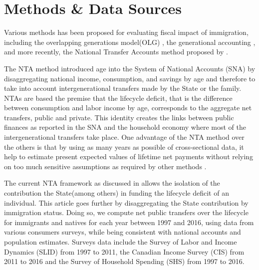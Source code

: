   \section*{Methods \& Data Sources}\label{sec:data}

  Various methods has been proposed for evaluating fiscal impact of immigration, including the overlapping generations model(OLG) \citep{Akin:2012gh,Ileri:2019hf,Storesletten:2000cn}, the generational accounting \citep{Auerbach:2000wg,Preston:2014uw,Sokhna:2018ww}, and more recently, the National Transfer Accounts  method proposed by \citet{Mason:2011wc}.

  \vspace{0.7em}\par
  The NTA method introduced age into the System of National Accounts (SNA) by disaggregating national income, consumption, and savings by age and therefore to take into account intergenerational transfers made by the State or the family. NTAs are based the premise that the lifecycle deficit, that is the difference between consumption and labor income by age, corresponds to the aggregate net transfers, public and private. This identity creates the links between public finances as reported in the SNA and the household economy where most of the intergenerational transfers take place. One advantage of the NTA method over the others is that by using as many years as possible of cross-sectional data, it help to estimate present expected values of lifetime net payments without relying on too much sensitive assumptions as required by other methods \citep{dAlbis:2019de}.

  \vspace{0.7em}\par
  The current NTA framework as discussed in \citet{UnitedNations:2013vz}allows the isolation of the contribution the State(among others) in funding the lifecycle deficit of an individual. This article goes further by disaggregating the State contribution by immigration status. Doing so, we compute net public transfers over the lifecycle for immigrants and natives for each year between 1997 and 2016, using data from various consumers surveys, while being consistent with national accounts and population estimates. Surveys data include the Survey of Labor and Income Dynamics (SLID) from 1997 to 2011, the Canadian Income Survey (CIS) from 2011 to 2016 and the Survey of Household Spending (SHS) from 1997 to 2016.

